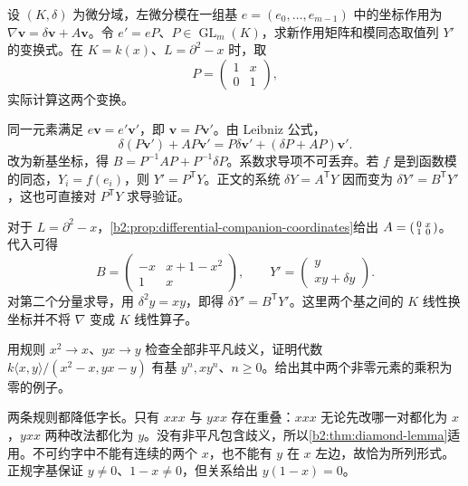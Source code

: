 \begin{optionalexercise}\label{b2:ex:20-differential-companion}
	设 \((K,\delta)\) 为微分域，左微分模在一组基 \(e=(e_0,\ldots,e_{m-1})\) 中的坐标作用为 \(\nabla\mathbf v=\delta\mathbf v+A\mathbf v\)。令 \(e'=eP\)、\(P\in\operatorname{GL}_m(K)\)，求新作用矩阵和模同态取值列 \(Y'\) 的变换式。在 \(K=k(x)\)、\(L=\partial^2-x\) 时，取
	\[
		P=\begin{pmatrix}1&x\\0&1\end{pmatrix},
	\]
	实际计算这两个变换。
\end{optionalexercise}
\begin{solution}
	同一元素满足 \(e\mathbf v=e'\mathbf v'\)，即 \(\mathbf v=P\mathbf v'\)。由 Leibniz 公式，
	\[
		\delta(P\mathbf v')+AP\mathbf v' =P\delta\mathbf v'+(\delta P+AP)\mathbf v'.
	\]
	改为新基坐标，得 \(B=P^{-1}AP+P^{-1}\delta P\)。系数求导项不可丢弃。若 \(f\) 是到函数模的同态，\(Y_i=f(e_i)\)，则 \(Y'=P^{\mathsf T}Y\)。正文的系统 \(\delta Y=A^{\mathsf T}Y\) 因而变为 \(\delta Y'=B^{\mathsf T}Y'\)，这也可直接对 \(P^{\mathsf T}Y\) 求导验证。

	对于 \(L=\partial^2-x\)，\cref{b2:prop:differential-companion-coordinates}给出 \(A=\begin{psmallmatrix}0&x\\1&0\end{psmallmatrix}\)。代入可得
	\[
		B=\begin{pmatrix}-x&x+1-x^2\\1&x\end{pmatrix},
		\qquad Y'=\begin{pmatrix}y\\xy+\delta y\end{pmatrix}.
	\]
	对第二个分量求导，用 \(\delta^2y=xy\)，即得 \(\delta Y'=B^{\mathsf T}Y'\)。这里两个基之间的 \(K\) 线性换坐标并不将 \(\nabla\) 变成 \(K\) 线性算子。
\end{solution}

\begin{optionalexercise}\label{b2:ex:20-diamond-idempotent-rules}
	用规则 \(x^2\to x\)、\(yx\to y\) 检查全部非平凡歧义，证明代数 \(k\langle x,y\rangle/(x^2-x,yx-y)\) 有基 \(y^n,xy^n\)、\(n\ge0\)。给出其中两个非零元素的乘积为零的例子。
\end{optionalexercise}
\begin{solution}
	两条规则都降低字长。只有 \(xxx\) 与 \(yxx\) 存在重叠：\(xxx\) 无论先改哪一对都化为 \(x\)，\(yxx\) 两种改法都化为 \(y\)。没有非平凡包含歧义，所以\cref{b2:thm:diamond-lemma}适用。不可约字中不能有连续的两个 \(x\)，也不能有 \(y\) 在 \(x\) 左边，故恰为所列形式。正规字基保证 \(y\ne0\)、\(1-x\ne0\)，但关系给出 \(y(1-x)=0\)。
\end{solution}

